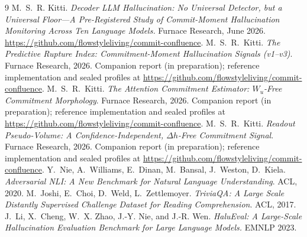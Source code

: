 \documentclass[11pt]{article}
\begin{document}
\begin{thebibliography}{9}
 M.~S.~R. Kitti.
\emph{Decoder LLM Hallucination: No Universal Detector, but a Universal Floor---A Pre-Registered
Study of Commit-Moment Hallucination Monitoring Across Ten Language Models.}
Furnace Research, June 2026. \url{https://github.com/flowstyleliving/commit-confluence}.
 M.~S.~R.~Kitti.
\emph{The Predictive Rupture Index: Commitment-Moment Hallucination Signals (v1--v3)}.
Furnace Research, 2026. Companion report (in preparation); reference implementation and sealed
profiles at \url{https://github.com/flowstyleliving/commit-confluence}.
 M.~S.~R.~Kitti.
\emph{The Attention Commitment Estimator: $W_u$-Free Commitment Morphology}.
Furnace Research, 2026. Companion report (in preparation); reference implementation and sealed
profiles at \url{https://github.com/flowstyleliving/commit-confluence}.
 M.~S.~R.~Kitti.
\emph{Readout Pseudo-Volume: A Confidence-Independent, $\Delta h$-Free Commitment Signal}.
Furnace Research, 2026. Companion report (in preparation); reference implementation and sealed
profiles at \url{https://github.com/flowstyleliving/commit-confluence}.
 Y.~Nie, A.~Williams, E.~Dinan, M.~Bansal, J.~Weston, D.~Kiela.
\emph{Adversarial NLI: A New Benchmark for Natural Language Understanding}. ACL, 2020.
 M.~Joshi, E.~Choi, D.~Weld, L.~Zettlemoyer.
\emph{TriviaQA: A Large Scale Distantly Supervised Challenge Dataset for Reading Comprehension}.
ACL, 2017.
 J.~Li, X.~Cheng, W.~X. Zhao, J.-Y. Nie, and J.-R. Wen.
\emph{HaluEval: A Large-Scale Hallucination Evaluation Benchmark for Large Language Models.}
EMNLP 2023.
\end{thebibliography}
\end{document}
